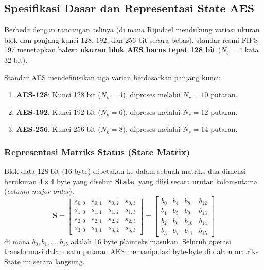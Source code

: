 \subsection{Spesifikasi Dasar dan Representasi State AES}

Berbeda dengan rancangan aslinya (di mana Rijndael mendukung variasi ukuran blok dan panjang kunci 128, 192, dan 256 bit secara bebas), standar resmi FIPS 197 menetapkan bahwa \textbf{ukuran blok AES harus tepat 128 bit} ($N_b = 4$ kata 32-bit).

Standar AES mendefinisikan tiga varian berdasarkan panjang kunci:
\begin{enumerate}
  \item \textbf{AES-128}: Kunci 128 bit ($N_k = 4$), diproses melalui $N_r = 10$ putaran.
  \item \textbf{AES-192}: Kunci 192 bit ($N_k = 6$), diproses melalui $N_r = 12$ putaran.
  \item \textbf{AES-256}: Kunci 256 bit ($N_k = 8$), diproses melalui $N_r = 14$ putaran.
\end{enumerate}

\subsubsection{Representasi Matriks Status (State Matrix)}

Blok data 128 bit (16 byte) dipetakan ke dalam sebuah matriks dua dimensi berukuran $4 \times 4$ byte yang disebut \textbf{State}, yang diisi secara urutan kolom-utama (\textit{column-major order}):
\begin{equation}
  \mathbf{S} = \begin{bmatrix}
    s_{0,0} & s_{0,1} & s_{0,2} & s_{0,3} \\
    s_{1,0} & s_{1,1} & s_{1,2} & s_{1,3} \\
    s_{2,0} & s_{2,1} & s_{2,2} & s_{2,3} \\
    s_{3,0} & s_{3,1} & s_{3,2} & s_{3,3}
  \end{bmatrix}
  =
  \begin{bmatrix}
    b_0 & b_4 & b_8 & b_{12} \\
    b_1 & b_5 & b_9 & b_{13} \\
    b_2 & b_6 & b_{10} & b_{14} \\
    b_3 & b_7 & b_{11} & b_{15}
  \end{bmatrix}
\end{equation}
di mana $b_0, b_1, \dots, b_{15}$ adalah 16 byte plainteks masukan. Seluruh operasi transformasi dalam satu putaran AES memanipulasi byte-byte di dalam matriks State ini secara langsung.

